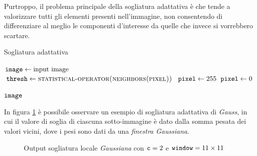 Purtroppo, il problema principale della sogliatura adattativa \`e che tende a valorizzare tutti gli elementi presenti nell'immagine, non consentendo di differenziare al meglio le componenti d'interesse da quelle che invece si vorrebbero scartare.
\begin{algorithm}[H]
	\caption{Sogliatura adattativa}
	\label{alg:thresh-local}
	\begin{algorithmic}[1]
			\State $\texttt{image} \gets \text{input image}$
			\\
				\State $\vars{thresh} \gets \textproc{statistical-operator(\textproc{neighbors(pixel)})}$
					\State $\texttt{pixel} \gets 255$
				\Else
					\State $\texttt{pixel} \gets 0$
				\EndIf
			\EndFor

			\Return $\texttt{image}$
		\EndFunction
	\end{algorithmic}
\end{algorithm}\par
In figura \ref{fig:image-bin-local} \`e possibile osservare un esempio di sogliatura adattativa di \textit{Gauss}, in cui il valore di soglia di ciascuna sotto-immagine \`e dato dalla somma pesata dei valori vicini, dove i pesi sono dati da una \textit{finestra Gaussiana}.

\begin{figure}[H]
	\centering
	\caption{Output sogliatura locale \textit{Gaussiana} con $\texttt{c}=2$ e $\texttt{window}=11\times11$}
	\label{fig:image-bin-local}
\end{figure}

